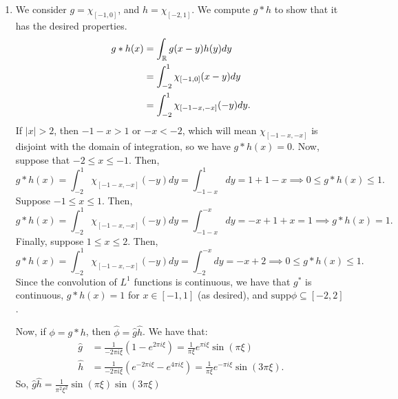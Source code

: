 \documentclass[11pt]{article}
\begin{document}
\begin{enumerate}[leftmargin=2em, label=\arabic*.]
\begin{enumerate}
            But then, $\hat{\phi}(r \xi_x)$ is concentrated in the interval $[-M / r, M / r]$, and $\hat{\phi}(\delta \xi_y)$ is concentrated in $[-\delta M / \delta, \delta M / \delta]$.
            If $r$ is large and $\delta$ is small, this means that the rectangle $[(-rM, -\delta M), (rM, \delta M)]$ in which $\widehat{f_{r, \delta}}$ is concentrated has a small dimension in the $\xi_x$ frequency axis and a short dimension in the $\xi_y$ frequency axis.
            Thus, it is concentrated close to the $\xi_x$ axis in frequency space.
        \item We consider $g = \chi_{[-1, 0]}$, and $h = \chi_{[-2, 1]}$.
            We compute $g * h$ to show that it has the desired properties.
            \begin{align*}
                g * h(x) &= \int_{\mathbb{R}} g(x - y) h(y) dy\\
                      &= \int_{-2}^{1} \chi_{[-1, 0]}(x - y)dy \\
                      &= \int_{-2}^{1} \chi_{[-1 - x, -x]}(-y)dy
            .\end{align*}
            If $|x| > 2$, then $-1 - x > 1$ or $-x < -2$, which will mean $\chi_{[-1 - x, -x]}$  is disjoint with the domain of integration, so we have $g * h (x ) = 0$.
            Now, suppose that $-2 \le x \le  -1$. Then,
            \[
            g * h(x) = \int_{-2}^{1} \chi_{[-1 - x, -x]}(-y)dy = \int_{-1 - x}^{1}dy = 1 + 1 - x \implies 0 \leq  g * h (x) \leq 1
            .\] 
            Suppose $-1 \leq x \leq 1$. Then,
            \[
            g * h(x) = \int_{-2}^{1} \chi_{[-1 - x, -x]}(-y)dy = \int_{-1 - x}^{-x}dy = -x + 1 + x = 1 \implies  g * h (x) = 1
            .\] 
            Finally, suppose $1 \leq x \leq 2$. Then,
            \[
            g * h(x) = \int_{-2}^{1} \chi_{[-1 - x, -x]}(-y)dy = \int_{-2}^{-x}dy = -x + 2 \implies 0 \leq  g * h (x) \leq 1
            .\] 
            Since the convolution of $L^{1}$ functions is continuous, we have that $g^{*}$ is continuous, $g*h(x) = 1$ for $x \in [-1, 1]$ (as desired), and $\mathrm{supp} \phi \subseteq [-2, 2]$.

            Now, if $\phi = g * h$, then $\hat{\phi} = \hat{g} \hat{h}$.
            We have that:
            \begin{align*}
                \hat{g} &= \frac{1}{-2\pi i \xi} (1 - e^{2\pi i \xi}) = \frac{1}{\pi \xi} e^{\pi i \xi} \sin(\pi \xi)\\
                \hat{h} &= \frac{1}{-2 \pi i \xi} (e^{-2 \pi i \xi} - e^{4 \pi i \xi}) = \frac{1}{\pi \xi} e^{-\pi i \xi} \sin(3 \pi \xi)
            .\end{align*}
            So, $\hat{g}\hat{h} = \frac{1}{\pi^2 \xi^2}\sin(\pi \xi) \sin(3 \pi \xi)$


\end{enumerate}
\end{enumerate}
\end{document}
